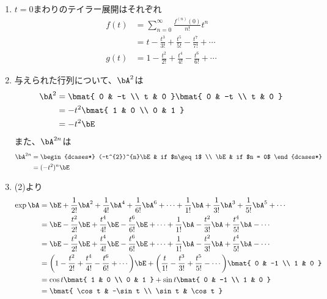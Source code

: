\begin{ans*}
  ${}$
  \begin{enumerate}[label=(\arabic*)]
    \item $t=0$まわりのテイラー展開はそれぞれ
    \begin{align}
      f(t)
      &= \sum_{n=0}^{\infty} \frac{f^{(n)}(0)}{n!} t^n \\
      &= t - \frac{t^3}{3!} + \frac{t^5}{5!} - \frac{t^7}{7!} + \cdots \\
      g(t)
      &= 1 - \frac{t^2}{2!} + \frac{t^4}{4!} - \frac{t^6}{6!} + \cdots
    \end{align}
    \item 与えられた行列について、$\bA^2$は
    \begin{align}
      \bA^2
      &=
      \bmat{
        0 & -t \\
        t & 0
      }
      \bmat{
        0 & -t \\
        t & 0
      } \\
      &= -t^2
      \bmat{
        1 & 0 \\
        0 & 1
      } \\
      &= -t^2 \bE
    \end{align}
    また、$\bA^{2n}$は
    \begin{align}
      \bA^{2n}
      &=
      \begin{dcases*}
        (-t^{2})^{n}\bE & if $n\geq 1$ \\
        \bE & if $n = 0$
      \end{dcases*} \\
      &= (-t^{2})^{n}\bE
    \end{align}
    \item (2)より
    \begin{align}
      \exp\bA
      &=
      \bE + \frac{1}{2!}\bA^2 + \frac{1}{4!}\bA^4 + \frac{1}{6!}\bA^6 + \cdots
      + \frac{1}{1!}\bA + \frac{1}{3!}\bA^3 + \frac{1}{5!}\bA^5 + \cdots \\
      &=
      \bE - \frac{t^2}{2!}\bE + \frac{t^4}{4!}\bE - \frac{t^6}{6!}\bE + \cdots
      + \frac{1}{1!}\bA - \frac{t^2}{3!}\bA + \frac{t^4}{5!}\bA - \cdots \\
      &=
      \bE - \frac{t^2}{2!}\bE + \frac{t^4}{4!}\bE - \frac{t^6}{6!}\bE + \cdots
      + \frac{1}{1!}\bA - \frac{t^2}{3!}\bA + \frac{t^4}{5!}\bA - \cdots \\
      &=
      \biggl(1 - \frac{t^2}{2!} + \frac{t^4}{4!} - \frac{t^6}{6!} + \cdots \biggr)\bE
      + \biggl(\frac{t}{1!} - \frac{t^3}{3!} + \frac{t^5}{5!} - \cdots \biggr)
      \bmat{
        0 & -1 \\
        1 & 0
      } \\
      &=
      \cos t
      \bmat{
        1 & 0 \\
        0 & 1
      }
      +
      \sin t
      \bmat{
        0 & -1 \\
        1 & 0
      } \\
      &=
      \bmat{
        \cos t & -\sin t \\
        \sin t & \cos t
      }
    \end{align}


\end{enumerate}
\end{ans*}
